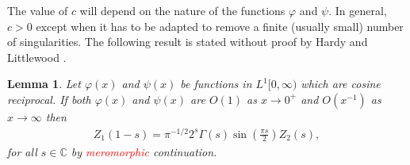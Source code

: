 \documentclass[11pt]{article}
\newtheorem{lemma}{Lemma}[section]
\newcommand{\C}{\mathbb{C}}
\numberwithin{equation}{section}		 			%
\numberwithin{figure}{section}			 			%
\begin{document}
\noindent The value of $c$ will depend on the nature of the functions $\varphi$ and $\psi$. In general, $c>0$ except when it has to be adapted to remove a finite (usually small) number of singularities. The following result is stated without proof by Hardy and Littlewood \cite{hardy_littlewood}.
\begin{lemma}
Let $\varphi(x)$ and $\psi(x)$ be functions in $L^1[0,\infty)$ which are cosine reciprocal. If both $\varphi(x)$ and $\psi(x)$ are $O(1)$ as $x \to 0^+$ and $O(x^{-1})$ as $x \to \infty$ then
\begin{align} \label{FEcosine}
{Z_1}(1 - s) = {\pi ^{ - 1/2}}{2^s}\Gamma (s)\sin \left( {\frac{{\pi s}}{2}} \right){Z_2}(s),
\end{align}
for all $s \in \C$ by \textcolor{red}{meromorphic} continuation.
\end{lemma}
\end{document}
